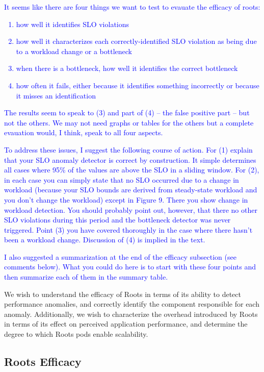 \textcolor{blue}{It seems like there are four things we want to test to
evauate the efficacy of roots:
\begin{enumerate}
\item how well it identifies SLO violations
\item how well it characterizes each correctly-identified SLO violation as
being due to a workload change or a bottleneck
\item when there is a bottleneck, how well it identifies the correct
bottleneck
\item how often it fails, either because it identifies something incorrectly
or because it misses an identification
\end{enumerate}
The results seem to speak to (3) and part of (4) -- the false positive part --
but not the others.  We may not need graphs or tables for the others but a
complete evauation would, I think, speak to all four aspects.}

\textcolor{blue}{To address these issues, I suggest the following course of
action.  For (1) explain that your SLO anomaly detector is correct by
construction.  It simple determines all cases where 95\% of the values are
above the SLO in a sliding window.  For (2), in each case you can simply state
that no SLO occurred due to a change in workload (because your SLO bounds are
derived from steady-state workload and you don't change the workload) except
in Figure 9.  There you show change in workload detection.  You should
probably point out, however, that there no other SLO violations during this
period and the bottleneck detector was never triggered.  Point
(3) you have covered thoroughly in the case where there hasn't been a workload
change.  
Discussion of (4) is implied in the text.}

\textcolor{blue}{I also suggested a summarization at the end of the efficacy
subsection (see comments below).  What you could do here is to start with
these four points and then summarize each of them in the summary table.}
 
We wish to understand the efficacy of Roots
in terms of its ability to detect performance anomalies, and correctly
identify the component responsible for each anomaly.  Additionally, we wish
to characterize the overhead introduced by Roots in terms of its effect on
perceived application performance, and determine the degree to which Roots
pods enable scalability.

\subsection{Roots Efficacy}

